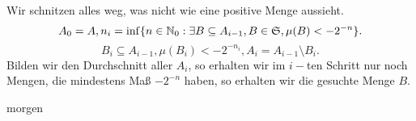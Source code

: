 		\begin{bew}
			Wir schnitzen alles weg, was nicht wie eine positive Menge aussieht.
			\[ A_0=A, n_i=\inf\{n\in\mathbb{N}_0: \exists B\subseteq A_{i-1}, B\in\mathfrak{S},\mu(B)<-2^{-n}\}. \]
			\[ B_i\subseteq A_{i-1}, \mu(B_i)<-2^{-{n_i}}, A_i=A_{i-1}\setminus B_i. \] 
			Bilden wir den Durchschnitt aller $A_i$, so erhalten wir im $i-$ten Schritt nur noch Mengen, die mindestens Maß $-2^{-n}$ haben, so erhalten wir die gesuchte Menge $B$. 
		\end{bew}
		
		\begin{bew}[Satz]
			morgen
		\end{bew}
